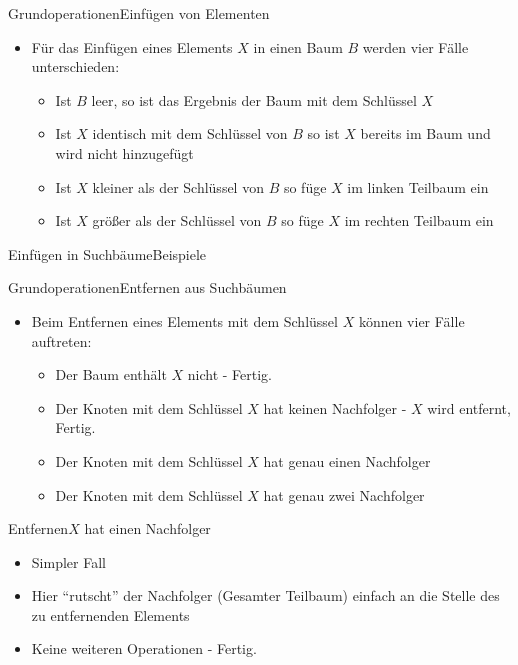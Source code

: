 \begin{frame}{Grundoperationen}{Einfügen von Elementen}
	\begin{itemize}
		\item Für das Einfügen eines Elements $X$ in einen Baum $B$ werden vier Fälle unterschieden:
		\begin{itemize}
			\item Ist $B$ leer, so ist das Ergebnis der Baum mit dem Schlüssel $X$
			\item Ist $X$ identisch mit dem Schlüssel von $B$ so ist $X$ bereits im Baum und wird nicht hinzugefügt
			\item Ist $X$ kleiner als der Schlüssel von $B$ so füge $X$ im linken Teilbaum ein
			\item Ist $X$ größer als der Schlüssel von $B$ so füge $X$ im rechten Teilbaum ein
		\end{itemize}
	\end{itemize}
\end{frame}

\begin{frame}{Einfügen in Suchbäume}{Beispiele}
\end{frame}

\begin{frame}{Grundoperationen}{Entfernen aus Suchbäumen}
\begin{itemize}
	\item Beim Entfernen eines Elements mit dem Schlüssel $X$ können vier Fälle auftreten:
	\begin{itemize}
		\item Der Baum enthält $X$ nicht - Fertig.
		\item Der Knoten mit dem Schlüssel $X$ hat keinen Nachfolger - $X$ wird entfernt, Fertig.
		\item Der Knoten mit dem Schlüssel $X$ hat genau einen Nachfolger
		\item Der Knoten mit dem Schlüssel $X$ hat genau zwei Nachfolger
	\end{itemize}
\end{itemize}
\end{frame}

\begin{frame}{Entfernen}{$X$ hat einen Nachfolger}
	\begin{itemize}
		\item Simpler Fall
		\item Hier "`rutscht"' der Nachfolger (Gesamter Teilbaum) einfach an die Stelle des zu entfernenden Elements
		\item Keine weiteren Operationen - Fertig.
	\end{itemize}
\end{frame}

